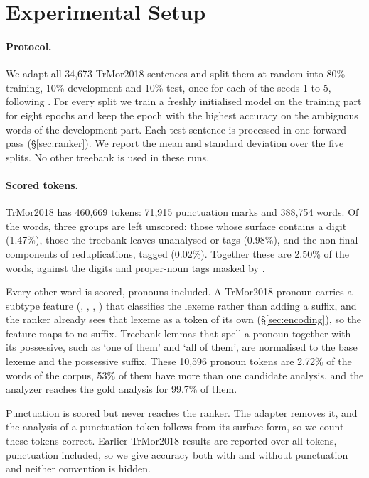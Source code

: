 \section{Experimental Setup}
\label{sec:setup}

\paragraph{Protocol.}
We adapt all 34,673 TrMor2018 sentences and split them at random into 80\% training, 10\% development and 10\% test, once for each of the seeds 1 to 5, following \citet{akyurek-etal-2019-morphological}. For every split we train a freshly initialised model on the training part for eight epochs and keep the epoch with the highest accuracy on the ambiguous words of the development part. Each test sentence is processed in one forward pass (\S\ref{sec:ranker}). We report the mean and standard deviation over the five splits. No other treebank is used in these runs.

\paragraph{Scored tokens.}
TrMor2018 has 460,669 tokens: 71,915 punctuation marks and 388,754 words. Of the words, three groups are left unscored: those whose surface contains a digit (1.47\%), those the treebank leaves unanalysed or tags  (0.98\%), and the non-final components of reduplications, tagged  (0.02\%). Together these are 2.50\% of the words, against the digits and proper-noun tags masked by \citet{akyurek-etal-2019-morphological}.

Every other word is scored, pronouns included. A TrMor2018 pronoun carries a subtype feature (, , , ) that classifies the lexeme rather than adding a suffix, and the ranker already sees that lexeme as a token of its own (\S\ref{sec:encoding}), so the feature maps to no suffix. Treebank lemmas that spell a pronoun together with its possessive, such as  `one of them' and  `all of them', are normalised to the base lexeme and the possessive suffix. These 10,596 pronoun tokens are 2.72\% of the words of the corpus, 53\% of them have more than one candidate analysis, and the analyzer reaches the gold analysis for 99.7\% of them.

Punctuation is scored but never reaches the ranker. The adapter removes it, and the analysis of a punctuation token follows from its surface form, so we count these tokens correct. Earlier TrMor2018 results are reported over all tokens, punctuation included, so we give accuracy both with and without punctuation and neither convention is hidden.

